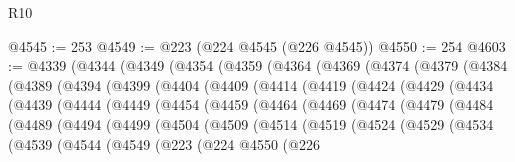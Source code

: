 \begin{lexlean}{R10}
\begin{coremodule}
@4545 := 253
@4549 := @223 (@224 @4545 (@226 @4545))
@4550 := 254
@4603 := @4339
    (@4344
      (@4349
        (@4354
          (@4359
            (@4364
              (@4369
                (@4374
                  (@4379
                    (@4384
                      (@4389
                        (@4394
                          (@4399
                            (@4404
                              (@4409
                                (@4414
                                  (@4419
                                    (@4424
                                      (@4429
                                        (@4434
                                          (@4439
                                            (@4444
                                              (@4449
                                                (@4454
                                                  (@4459
                                                    (@4464
                                                      (@4469
                                                        (@4474
                                                          (@4479
                                                            (@4484
                                                              (@4489
                                                                (@4494
                                                                  (@4499
                                                                    (@4504
                                                                      (@4509
                                                                        (@4514
                                                                          (@4519
                                                                            (@4524
                                                                              (@4529
                                                                                (@4534
                                                                                  (@4539
                                                                                    (@4544
                                                                                      (@4549
                                                                                        (@223
                                                                                          (@224
                                                                                            @4550
                                                                                            (@226

\end{coremodule}
\end{lexlean}
